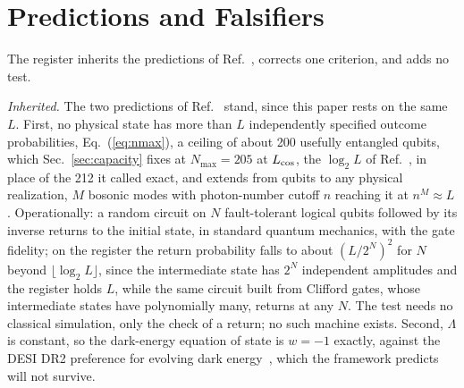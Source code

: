 \documentclass[aps,prd,twocolumn,superscriptaddress,nofootinbib]{revtex4-2}
\begin{document}
\section{Predictions and Falsifiers}
\label{sec:pred}

The register inherits the predictions of Ref.~\cite{korytko2026}, corrects one criterion, and adds no test.

\textit{Inherited.} The two predictions of Ref.~\cite{korytko2026} stand, since this paper rests on the same $L$. First, no physical state has more than $L$ independently specified outcome probabilities, Eq.~(\ref{eq:nmax}), a ceiling of about 200 usefully entangled qubits, which Sec.~\ref{sec:capacity} fixes at $N_{\max} = 205$ at $L_{\rm cos}$, the $\log_2 L$ of Ref.~\cite{korytko2026}, in place of the 212 it called exact, and extends from qubits to any physical realization, $M$ bosonic modes with photon-number cutoff $n$ reaching it at $n^M \approx L$. Operationally: a random circuit on $N$ fault-tolerant logical qubits followed by its inverse returns to the initial state, in standard quantum mechanics, with the gate fidelity; on the register the return probability falls to about $(L/2^N)^2$ for $N$ beyond $\lfloor\log_2 L\rfloor$, since the intermediate state has $2^N$ independent amplitudes and the register holds $L$, while the same circuit built from Clifford gates, whose intermediate states have polynomially many, returns at any $N$. The test needs no classical simulation, only the check of a return; no such machine exists. Second, $\Lambda$ is constant, so the dark-energy equation of state is $w = -1$ exactly, against the DESI DR2 preference for evolving dark energy~\cite{desi2025}, which the framework predicts will not survive.
\end{document}
